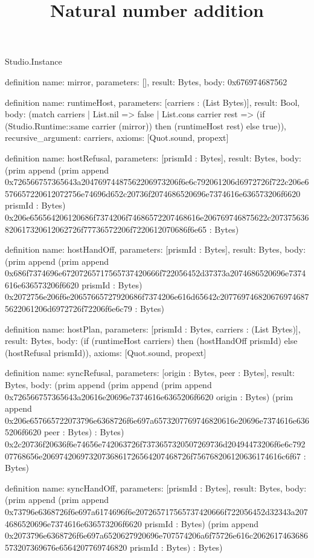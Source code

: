 \begin{lexlean}{Studio.Instance}
\title{Natural number addition}
\begin{semanticmodule}
definition{
  name: mirror,
  parameters: [],
  result: Bytes,
  body: 0x676974687562
}

definition{
  name: runtimeHost,
  parameters: [carriers : (List Bytes)],
  result: Bool,
  body: (match carriers
    | List.nil => false
    | List.cons carrier rest => (if (Studio.Runtime::same carrier (mirror)) then (runtimeHost rest) else true)),
  recursive_argument: carriers,
  axioms: [Quot.sound, propext]
}

definition{
  name: hostRefusal,
  parameters: [prismId : Bytes],
  result: Bytes,
  body: (prim append (prim append 0x726566757365643a20476974487562206973206f6e6c792061206d6972726f722c206e6576657220612072756e74696d652c20736f2074686520696e7374616e636573206f6620 prismId : Bytes) 0x206e656564206120686f7374206f74686572207468616e206769746875622c207375636820617320612062726f77736572206f7220612070686f6e65 : Bytes)
}

definition{
  name: hostHandOff,
  parameters: [prismId : Bytes],
  result: Bytes,
  body: (prim append (prim append 0x686f7374696e67207265717565737420666f722056452d37373a2074686520696e7374616e636573206f6620 prismId : Bytes) 0x2072756e206f6e20657665727920686f7374206e616d65642c2077697468206769746875622061206d6972726f72206f6e6c79 : Bytes)
}

definition{
  name: hostPlan,
  parameters: [prismId : Bytes, carriers : (List Bytes)],
  result: Bytes,
  body: (if (runtimeHost carriers) then (hostHandOff prismId) else (hostRefusal prismId)),
  axioms: [Quot.sound, propext]
}

definition{
  name: syncRefusal,
  parameters: [origin : Bytes, peer : Bytes],
  result: Bytes,
  body: (prim append (prim append (prim append 0x726566757365643a20616e20696e7374616e6365206f6620 origin : Bytes) (prim append 0x206e657665722073796e6368726f6e697a6573207769746820616e20696e7374616e6365206f6620 peer : Bytes) : Bytes) 0x2c20736f20636f6e74656e742063726f7373657320507269736d20494473206f6e6c79207768656e20697420697320736861726564207468726f756768206120636174616c6f67 : Bytes)
}

definition{
  name: syncHandOff,
  parameters: [prismId : Bytes],
  result: Bytes,
  body: (prim append (prim append 0x73796e6368726f6e697a6174696f6e207265717565737420666f722056452d32343a2074686520696e7374616e636573206f6620 prismId : Bytes) (prim append 0x2073796e6368726f6e697a6520627920696e707574206a6f75726e616c2062617463686573207369676e6564207769746820 prismId : Bytes) : Bytes)
}


\end{semanticmodule}
\end{lexlean}
